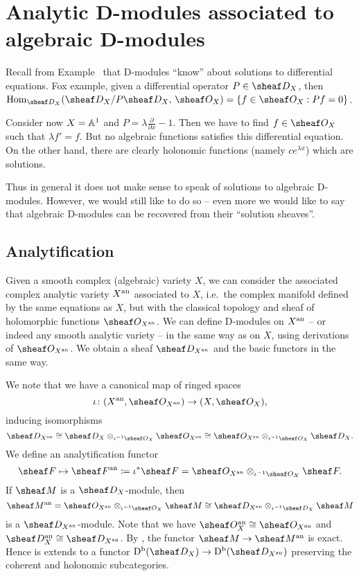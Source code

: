 \documentclass[number-in-sections,a4paper]{notes}
\begin{document}
\section{Analytic D-modules associated to algebraic D-modules}

Recall from Example~\label{ex:sol_fct} that D-modules \enquote{know} about solutions to differential equations.
Fox example, given a differential operator $P \in \sD_X$, then $ \Hom_{\sD_X}(\sD_X/P\sD_X,\, \sO_X) = \{ f \in \sO_X : Pf = 0 \}$.

Consider now $X = \mathbb A^{1}_{}$ and $P = \lambda\frac{\partial}{\partial x} -1$.
Then we have to find $f \in \sO_X$ such that $\lambda f' = f$.
But no algebraic functions satisfies this differential equation.
On the other hand, there are clearly holonomic functions (namely $ce^{\lambda x}$) which are solutions.

Thus in general it does not make sense to speak of solutions to algebraic D-modules.
However, we would still like to do so -- even more we would like to say that algebraic D-modules can be recovered from their \enquote{solution sheaves}.

\subsection{Analytification}

Given a smooth complex (algebraic) variety $X$, we can consider the associated complex analytic variety $X^{\mathrm{an}}$ associated to $X$, i.e.~the complex manifold defined by the same equations as $X$, but with the classical topology and sheaf of holomorphic functions $\sO_{X^\an}$.
We can define D-modules on $X^{\mathrm{an}}$ -- or indeed any smooth analytic variety -- in the same way as on $X$, using derivations of $\sO_{X^\an}$.
We obtain a sheaf $\sD_{X^\an}$ and the basic functors in the same way.

We note that we have a canonical map of ringed spaces
\[
    \iota\colon (X^\an, \sO_{X^{\an}}) \to (X, \sO_X),
\]
inducing isomorphisms
\[
    \sD_{X^\an} \cong \sD_{X} \otimes_{\iota^{-1}\sO_X} \sO_{X^\an} \cong \sO_{X^\an} \otimes_{\iota^{-1}\sO_X} \sD_{X}.
\]
We define an analytification functor
\[
    \sheaf F \mapsto \sheaf F^\an \coloneqq \iota^*\sheaf F = \sO_{X^\an} \otimes_{\iota^{-1}\sO_{X}} \sheaf F.
\]
If $\sheaf M$ is a $\sD_X$-module, then
\[
    \sheaf M^\an = 
    \sO_{X^\an} \otimes_{\iota^{-1}\sO_{X}} \sheaf M \cong
    \sD_{X^\an} \otimes_{\iota^{-1}\sD_{X}} \sheaf M
\]
is a $\sD_{X^\an}$-module.
Note that we have $\sO_X^\an \cong \sO_{X^\an}$ and $\sD_X^\an \cong \sD_{X^\an}$.
By \cite[Proposition~10]{Serre:GAGA}, the functor $\sheaf M \to \sheaf M^\an$ is exact.
Hence is extends to a functor $\catDbDMod{X} \to \catDbDMod{X^\an}$ preserving the coherent and holonomic subcategories.
\end{document}
